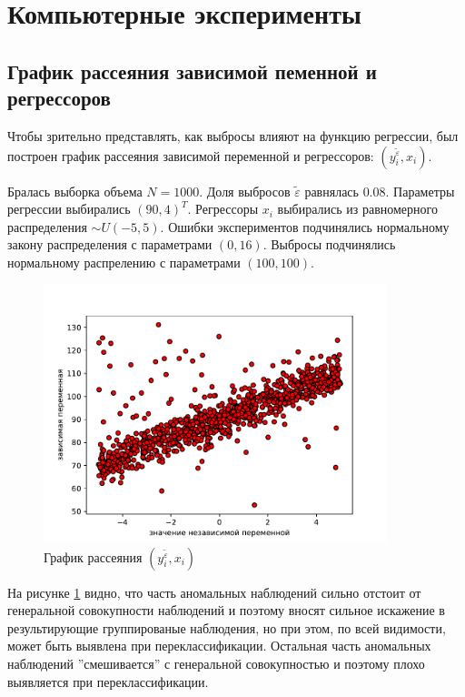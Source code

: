 \section{Компьютерные эксперименты}\label{sec_exp}
\subsection{График рассеяния зависимой пеменной и регрессоров}
Чтобы зрительно представлять, как выбросы влияют на функцию регрессии, был построен график рассеяния зависимой переменной и регрессоров: $(y_i^{\widetilde{\varepsilon}}, x_i)$.

Бралась выборка объема $N = 1000$. Доля выбросов $\widetilde{\varepsilon}$ равнялась $0.08$. 
Параметры регрессии выбирались $(90, 4)^T$. 
Регрессоры $x_i$ выбирались из равномерного распределения $\sim U(-5,5)$. 
Ошибки экспериментов подчинялись нормальному закону распределения с параметрами $(0, 16)$. Выбросы подчинялись нормальному распрелению с параметрами $(100, 100)$. 

\begin{figure}[h!]
    \centering
    \includegraphics[width=100mm]{../images/scatter.pdf}
    \caption{График рассеяния $(y_i^{\widetilde{\varepsilon}}, x_i)$\label{overflow}}
    \label{pic_scatter}
\end{figure}

На рисунке \ref{pic_scatter} видно, что часть аномальных наблюдений сильно отстоит от генеральной совокупности наблюдений и поэтому вносят сильное искажение в результирующие группированые наблюдения, но при этом, по всей видимости, может быть выявлена при переклассификации.
Остальная часть аномальных наблюдений ''смешивается'' с генеральной совокупностью и поэтому плохо выявляется при переклассификации.

\newpage


